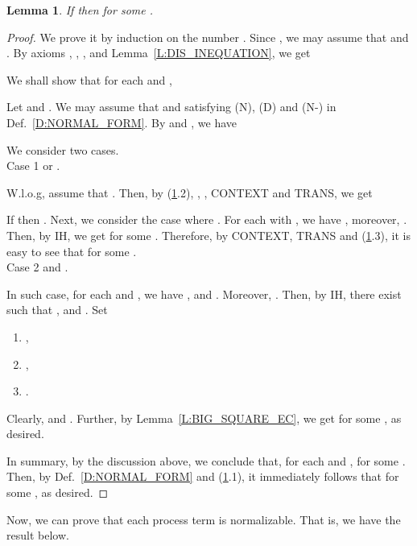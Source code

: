 \documentclass{elsarticle}
\theoremstyle{plain}
\newtheorem{lemma}[theorem]{Lemma}
\theoremstyle{definition}
\begin{document}
\begin{lemma}\label{L:COMP_PARALLEL}
  If  then  for some .
\end{lemma}
\begin{proof}
We prove it by induction on the number .
Since , we may assume that  and .
 By axioms , , ,  and Lemma~\ref{L:DIS_INEQUATION}, we get
    
    We shall show that for each  and ,
    
     Let  and .
     We may assume that  and  satisfying (N), (D) and (N-) in Def.~\ref{D:NORMAL_FORM}.
     By  and , we have
            
    We consider two cases.\\

\noindent    Case 1  or .

    W.l.o.g, assume that . Then, by (\ref{L:COMP_PARALLEL}.2), , , CONTEXT and TRANS, we get
    
    If  then .
    Next, we consider the case where .
    For each  with , we have , moreover, .
    Then, by IH, we get  for some .
    Therefore, by CONTEXT, TRANS and (\ref{L:COMP_PARALLEL}.3), it is easy to see that  for some .\\

\noindent    Case 2  and  .

    In such case, for each  and , we have ,  and .
      Moreover, .
      Then, by IH, there exist  such that ,   and .
            Set
    \begin{enumerate}
      \item  ,
      \item  ,
      \item .
    \end{enumerate}
    Clearly,  and .
    Further, by Lemma~\ref{L:BIG_SQUARE_EC}, we get  for some , as desired.

     In summary, by the discussion above, we conclude that, for each  and ,  for some .
     Then, by Def.~\ref{D:NORMAL_FORM} and (\ref{L:COMP_PARALLEL}.1), it immediately follows that  for some , as desired.
\end{proof}

Now, we can prove that each process term is normalizable. That is,  we have the result below.
\end{document}
